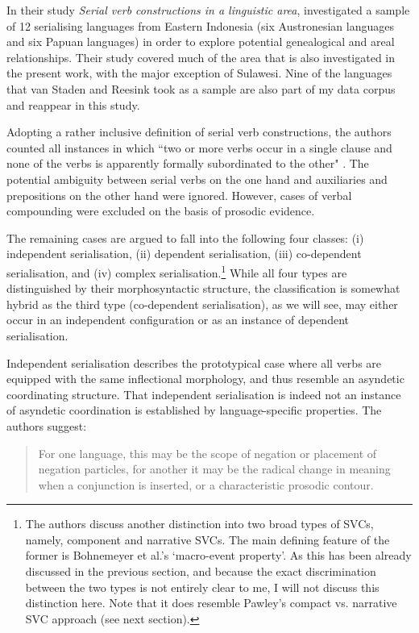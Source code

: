 In their study \textit{Serial verb constructions in a linguistic area}, \citet{vanstaden2008serial} investigated a sample of 12 serialising languages from Eastern Indonesia (six Austronesian languages and six Papuan languages) in order to explore potential genealogical and areal relationships. Their study covered much of the area that is also investigated in the present work, with the major exception of Sulawesi. Nine of the languages that van Staden and Reesink took as a sample are also part of my data corpus and reappear in this study. 

Adopting a rather inclusive definition of serial verb constructions, the authors counted all instances in which ``two or more verbs occur in a single clause and none of the verbs is apparently formally subordinated to the other" \citep[22]{vanstaden2008serial}. The potential ambiguity between serial verbs on the one hand and auxiliaries and prepositions on the other hand were ignored. However, cases of verbal compounding were excluded on the basis of prosodic evidence. 

The remaining cases are argued to fall into the following four classes: (i) independent serialisation, (ii) dependent serialisation, (iii) co-dependent serialisation, and (iv) complex serialisation.\footnote{The authors discuss another distinction into two broad types of SVCs, namely, component and narrative SVCs. The main defining feature of the former is Bohnemeyer et al.'s `macro-event property'. As this has been already discussed in the previous section, and because the exact discrimination between the two types is not entirely clear to me, I will not discuss this distinction here. Note that it does resemble Pawley's compact vs. narrative SVC approach (see next section).} While all four types are distinguished by their morphosyntactic structure, the classification is somewhat hybrid as the third type (co-dependent serialisation), as we will see, may either occur in an independent configuration or as an instance of dependent serialisation.

Independent serialisation describes the prototypical case where all verbs are equipped with the same inflectional morphology, and thus resemble an asyndetic coordinating structure. That independent serialisation is indeed not an instance of asyndetic coordination is established by language-specific properties. The authors suggest:

\begin{quote}For one language, this may be the scope of negation or placement of negation particles, for another it may be the radical change in meaning when a conjunction is inserted, or a characteristic prosodic contour. \citep[23]{vanstaden2008serial}\end{quote}

